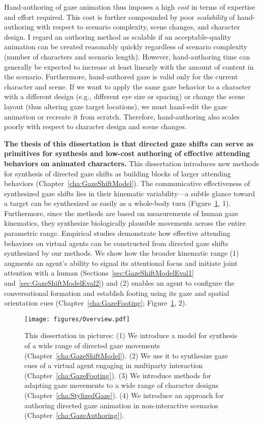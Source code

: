 Hand-authoring of gaze animation thus imposes a high \emph{cost} in terms of expertise and effort required. This cost is further compounded by poor \emph{scalability} of hand-authoring with respect to scenario complexity, scene changes, and character design. I regard an authoring method as scalable if an acceptable-quality animation can be created reasonably quickly regardless of scenario complexity (number of characters and scenario length). However, hand-authoring time can generally be expected to increase at least linearly with the amount of content in the scenario. Furthermore, hand-authored gaze is valid only for the current character and scene. If we want to apply the same gaze behavior to a character with a different design (e.g., different eye size or spacing) or change the scene layout (thus altering gaze target locations), we must hand-edit the gaze animation or recreate it from scratch. Therefore, hand-authoring also scales poorly with respect to character design and scene changes.

\textbf{The thesis of this dissertation is that directed gaze shifts can serve as primitives for synthesis and low-cost authoring of effective attending behaviors on animated characters.} This dissertation introduces new methods for synthesis of directed gaze shifts as building blocks of larger attending behaviors (Chapter~\ref{cha:GazeShiftModel}). The communicative effectiveness of synthesized gaze shifts lies in their kinematic variability---a subtle glance toward a target can be synthesized as easily as a whole-body turn (Figure~\ref{fig:Overview}, 1). Furthermore, since the methods are based on measurements of human gaze kinematics, they synthesize biologically plausible movements across the entire parametric range.
Empirical studies demonstrate how effective attending behaviors on virtual agents can be constructed from directed gaze shifts synthesized by our methods. We show how the broader kinematic range (1) augments an agent's ability to signal its attentional focus and initiate joint attention with a human (Sections~\ref{sec:GazeShiftModelEval1} and~\ref{sec:GazeShiftModelEval2}) and (2) enables an agent to configure the conversational formation and establish footing using its gaze and spatial orientation cues (Chapter~\ref{cha:GazeFooting}; Figure~\ref{fig:Overview}, 2).

\begin{figure}
\centering
\texttt{[image: figures/Overview.pdf]}
\caption{This dissertation in pictures: (1) We introduce a model for synthesis of a wide range of directed gaze movements (Chapter~\ref{cha:GazeShiftModel}). (2) We use it to synthesize gaze cues of a virtual agent engaging in multiparty interaction (Chapter~\ref{cha:GazeFooting}). (3) We introduce methods for adapting gaze movements to a wide range of character designs (Chapter~\ref{cha:StylizedGaze}). (4) We introduce an approach for authoring directed gaze animation in non-interactive scenarios (Chapter~\ref{cha:GazeAuthoring}).}
\label{fig:Overview}
\end{figure}

